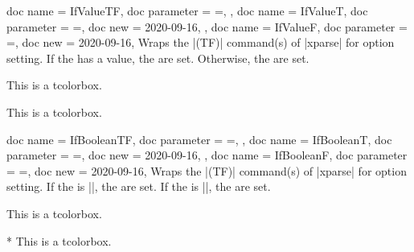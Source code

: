\medskip

\begin{docTcbKeys}[doc description = {no default}]
  {
    {
      doc name        = IfValueTF,
      doc parameter   = {=},
    },
    {
      doc name        = IfValueT,
      doc parameter   = {=},
      doc new         = 2020-09-16,
    },
    {
      doc name        = IfValueF,
      doc parameter   = {=},
      doc new         = 2020-09-16,
    }
  }
  Wraps the |\IfValue(TF)| command(s) of |xparse| for option setting.
  If the  has a value, the  are set.
  Otherwise, the  are set.
\begin{dispExample}

\begin{mybox}
This is a tcolorbox.
\end{mybox}

\begin{mybox}[My title]
This is a tcolorbox.
\end{mybox}
\end{dispExample}
\end{docTcbKeys}

\clearpage

\begin{docTcbKeys}[doc description = {no default}]
  {
    {
      doc name        = IfBooleanTF,
      doc parameter   = {=},
    },
    {
      doc name        = IfBooleanT,
      doc parameter   = {=},
      doc new         = 2020-09-16,
    },
    {
      doc name        = IfBooleanF,
      doc parameter   = {=},
      doc new         = 2020-09-16,
    }
  }
  Wraps the |\IfBoolean(TF)| command(s) of |xparse| for option setting.
  If the  is |\BooleanTrue|, the  are set.
  If the  is |\BooleanFalse|, the  are set.

\begin{dispExample}

\begin{mybox}
This is a tcolorbox.
\end{mybox}

\begin{mybox}*
This is a tcolorbox.
\end{mybox}
\end{dispExample}
\end{docTcbKeys}




